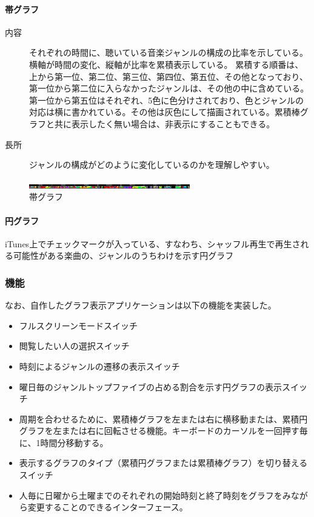 \documentclass{jsarticle}
\begin{document}
\paragraph{帯グラフ}
\begin{description}
\item[内容]
それぞれの時間に、聴いている音楽ジャンルの構成の比率を示している。横軸が時間の変化、縦軸が比率を累積表示している。
累積する順番は、上から第一位、第二位、第三位、第四位、第五位、その他となっており、第一位から第二位に入らなかったジャンルは、その他の中に含めている。第一位から第五位はそれぞれ、5色に色分けされており、色とジャンルの対応は横に書かれている。その他は灰色にして描画されている。累積棒グラフと共に表示したく無い場合は、非表示にすることもできる。
\item[長所]
ジャンルの構成がどのように変化しているのかを理解しやすい。
\end{description}





\begin{figure}[htbp]
\begin{center}
\includegraphics[width=7cm]{beltGraph.jpg}
\caption{帯グラフ}
\end{center}
\end{figure}

\paragraph{円グラフ}
\begin{description}
\item
iTunes上でチェックマークが入っている、すなわち、シャッフル再生で再生される可能性がある楽曲の、ジャンルのうちわけを示す円グラフ
\end{description}


\subsubsection{機能}
なお、自作したグラフ表示アプリケーションは以下の機能を実装した。
\begin{itemize}
\item
フルスクリーンモードスイッチ
\item
閲覧したい人の選択スイッチ
\item
時刻によるジャンルの遷移の表示スイッチ
\item
曜日毎のジャンルトップファイブの占める割合を示す円グラフの表示スイッチ
\item
周期を合わせるために、累積棒グラフを左または右に横移動または、累積円グラフを左または右に回転させる機能。キーボードのカーソルを一回押す毎に、1時間分移動する。
\item
表示するグラフのタイプ（累積円グラフまたは累積棒グラフ）を切り替えるスイッチ
\item
人毎に日曜から土曜までのそれぞれの開始時刻と終了時刻をグラフをみながら変更することのできるインターフェース。
\end{itemize}
\end{document}
